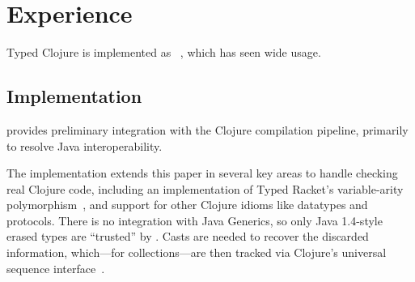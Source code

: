 \section{Experience}
\label{sec:experience}

Typed Clojure is implemented as \coretyped{}~\cite{coretyped},
which has seen wide usage.

\subsection{Implementation}

\coretyped{} provides preliminary integration with the Clojure compilation
pipeline, primarily to resolve Java interoperability.


The \coretyped{} implementation extends this paper in several key areas 
to handle checking real Clojure code, including an implementation
of Typed Racket's variable-arity polymorphism~\cite{stf-esop}, 
and support for other Clojure idioms like datatypes and protocols.
%
There is no integration with Java Generics, so only Java 1.4-style erased types are ``trusted''
by \coretyped{}.
Casts are needed to recover the discarded information, which---for collections---are 
then tracked via Clojure's universal sequence interface~\cite{CljSeqDoc}.



